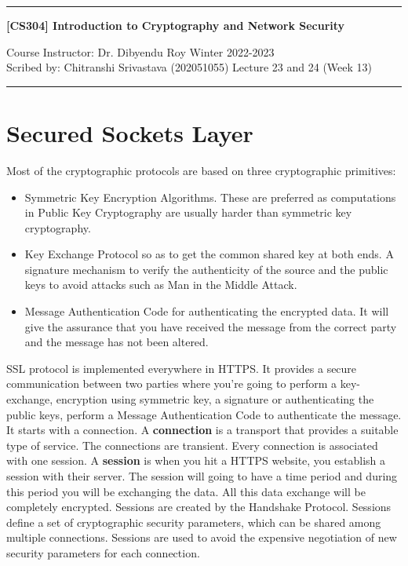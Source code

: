 \documentclass[11pt]{article}
\begin{document}
\noindent
\rule{\textwidth}{1pt}
\begin{center}
{\bf [CS304] Introduction to Cryptography and Network Security}
\end{center}
Course Instructor: Dr. Dibyendu Roy \hfill Winter 2022-2023\\
Scribed by: Chitranshi Srivastava (202051055) \hfill Lecture 23 and 24 (Week 13)
\\
\rule{\textwidth}{1pt}
\section{Secured Sockets Layer}
Most of the cryptographic protocols are based on three cryptographic primitives:
\begin{itemize}
    \item Symmetric Key Encryption Algorithms. These are preferred as computations in Public Key Cryptography are usually harder than symmetric key cryptography.
    \item Key Exchange Protocol so as to get the common shared key at both ends. A signature mechanism to verify the authenticity of the source and the public keys to avoid attacks such as Man in the Middle Attack.
    \item Message Authentication Code for authenticating the encrypted data. It will give the assurance that you have received the message from the correct party and the message has not been altered.
\end{itemize}
SSL protocol is implemented everywhere in HTTPS. It provides a secure communication between two parties where you're going to perform a key-exchange, encryption using symmetric key, a signature or authenticating the public keys, perform a Message Authentication Code to authenticate the message. \\
\newline
It starts with a connection. A \textbf{connection} is a transport that provides a suitable type of service. The connections are transient. Every connection is associated with one session. A \textbf{session} is when you hit a HTTPS website, you establish a session with their server. The session will going to have a time period and during this period you will be exchanging the data. All this data exchange will be completely encrypted. Sessions
are created by the Handshake Protocol. Sessions define a set of cryptographic security parameters, which can be shared among multiple connections. Sessions are used to avoid the expensive negotiation of new security parameters for each connection.\\
\end{document}
